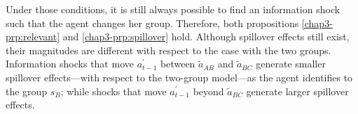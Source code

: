 Under those conditions, it is still always possible to find an information shock such that the agent changes her group. Therefore, both propositions \ref{chap3-prp:relevant} and \ref{chap3-prp:spillover} hold. Although spillover effects still exist, their magnitudes are different with respect to the case with the two groups. Information shocks that move $a^\prime_{t-1}$ between $\widetilde{a}_{AB}$ and $\widetilde{a}_{BC}$ generate smaller spillover effects---with respect to the two-group model---as the agent identifies to the group $s_B$; while shocks that move $a^\prime_{t-1}$ beyond $\widetilde{a}_{BC}$ generate larger spillover effects.